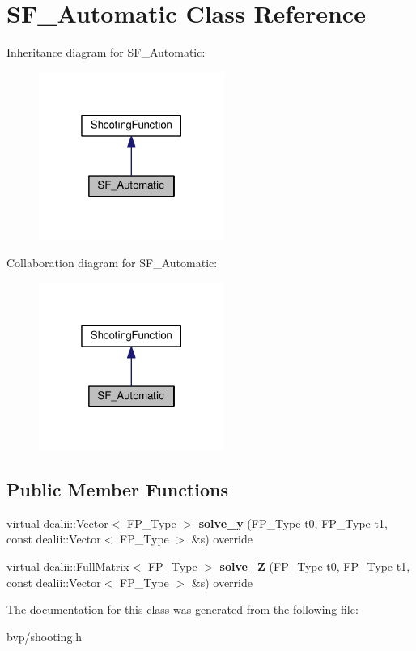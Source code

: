 \hypertarget{classSF__Automatic}{}\section{S\+F\+\_\+\+Automatic Class Reference}
\label{classSF__Automatic}


Inheritance diagram for S\+F\+\_\+\+Automatic\+:
\nopagebreak
\begin{figure}[H]
\begin{center}
\leavevmode
\includegraphics[width=172pt]{classSF__Automatic__inherit__graph}
\end{center}
\end{figure}


Collaboration diagram for S\+F\+\_\+\+Automatic\+:
\nopagebreak
\begin{figure}[H]
\begin{center}
\leavevmode
\includegraphics[width=172pt]{classSF__Automatic__coll__graph}
\end{center}
\end{figure}
\subsection*{Public Member Functions}
\begin{DoxyCompactItemize}
\item 
\mbox{\label{classSF__Automatic_a06c88515dae61fbdbefab45262931aeb}} 
virtual dealii\+::\+Vector$<$ F\+P\+\_\+\+Type $>$ {\bfseries solve\+\_\+y} (F\+P\+\_\+\+Type t0, F\+P\+\_\+\+Type t1, const dealii\+::\+Vector$<$ F\+P\+\_\+\+Type $>$ \&s) override
\item 
\mbox{\label{classSF__Automatic_ab0217a486652fd9c16110fcd8466b58d}} 
virtual dealii\+::\+Full\+Matrix$<$ F\+P\+\_\+\+Type $>$ {\bfseries solve\+\_\+Z} (F\+P\+\_\+\+Type t0, F\+P\+\_\+\+Type t1, const dealii\+::\+Vector$<$ F\+P\+\_\+\+Type $>$ \&s) override
\end{DoxyCompactItemize}


The documentation for this class was generated from the following file\+:\begin{DoxyCompactItemize}
\item 
bvp/shooting.\+h\end{DoxyCompactItemize}
